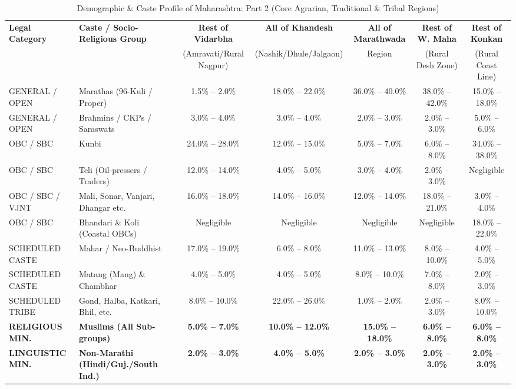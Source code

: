 \documentclass{article}
\begin{document}
\begin{table}[htbp]
\centering
\caption{Demographic \& Caste Profile of Maharashtra: Part 2 (Core Agrarian, Traditional \& Tribal Regions)}
\label{tab:maharashtra_rural_split}
\footnotesize
\begin{tabular}{l p{4.2cm} c c c c c}
\toprule
\textbf{Legal Category} & \textbf{Caste / Socio-Religious Group} & \textbf{Rest of Vidarbha} & \textbf{All of Khandesh} & \textbf{All of Marathwada} & \textbf{Rest of W. Maha} & \textbf{Rest of Konkan} \\
 & & (Amravati/Rural Nagpur) & (Nashik/Dhule/Jalgaon) & Region & (Rural Desh Zone) & (Rural Coast Line) \\
\midrule
GENERAL / OPEN & Marathas (96-Kuli / Proper) & 1.5\% -- 2.0\% & 18.0\% -- 22.0\% & 36.0\% -- 40.0\% & 38.0\% -- 42.0\% & 15.0\% -- 18.0\% \\
GENERAL / OPEN & Brahmins / CKPs / Saraswats & 3.0\% -- 4.0\% & 3.0\% -- 4.0\% & 2.0\% -- 3.0\% & 2.0\% -- 3.0\% & 5.0\% -- 6.0\% \\
\addlinespace
OBC / SBC & Kunbi & 24.0\% -- 28.0\% & 12.0\% -- 15.0\% & 5.0\% -- 7.0\% & 6.0\% -- 8.0\% & 34.0\% -- 38.0\% \\
OBC / SBC & Teli (Oil-pressers / Traders) & 12.0\% -- 14.0\% & 4.0\% -- 5.0\% & 3.0\% -- 4.0\% & 2.0\% -- 3.0\% & Negligible \\
OBC / SBC / VJNT & Mali, Sonar, Vanjari, Dhangar etc. & 16.0\% -- 18.0\% & 14.0\% -- 16.0\% & 12.0\% -- 14.0\% & 18.0\% -- 21.0\% & 3.0\% -- 4.0\% \\
OBC / SBC & Bhandari \& Koli (Coastal OBCs) & Negligible & Negligible & Negligible & Negligible & 18.0\% -- 22.0\% \\
\addlinespace
SCHEDULED CASTE & Mahar / Neo-Buddhist & 17.0\% -- 19.0\% & 6.0\% -- 8.0\% & 11.0\% -- 13.0\% & 8.0\% -- 10.0\% & 4.0\% -- 5.0\% \\
SCHEDULED CASTE & Matang (Mang) \& Chambhar & 4.0\% -- 5.0\% & 4.0\% -- 5.0\% & 8.0\% -- 10.0\% & 7.0\% -- 8.0\% & 2.0\% -- 3.0\% \\
\addlinespace
SCHEDULED TRIBE & Gond, Halba, Katkari, Bhil, etc. & 8.0\% -- 10.0\% & 22.0\% -- 26.0\% & 1.0\% -- 2.0\% & 2.0\% -- 3.0\% & 8.0\% -- 10.0\% \\
\addlinespace
\midrule
\textbf{RELIGIOUS MIN.} & \textbf{Muslims (All Sub-groups)} & \textbf{5.0\% -- 7.0\%} & \textbf{10.0\% -- 12.0\%} & \textbf{15.0\% -- 18.0\%} & \textbf{6.0\% -- 8.0\%} & \textbf{6.0\% -- 8.0\%} \\
\textbf{LINGUISTIC MIN.} & \textbf{Non-Marathi (Hindi/Guj./South Ind.)} & \textbf{2.0\% -- 3.0\%} & \textbf{4.0\% -- 5.0\%} & \textbf{2.0\% -- 3.0\%} & \textbf{2.0\% -- 3.0\%} & \textbf{2.0\% -- 3.0\%} \\
\bottomrule
\end{tabular}
\end{table}
\end{document}
